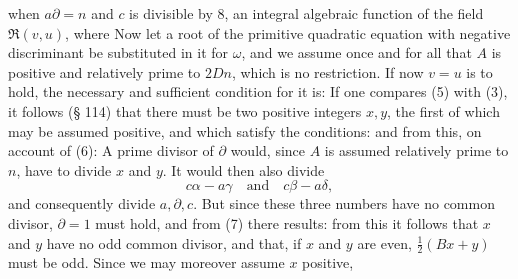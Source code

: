 when $a\partial = n$ and $c$ is divisible by 8, an integral algebraic
function of the field $\mathfrak{R}(v,u)$, where
Now let a root of the primitive quadratic equation
with negative discriminant
be substituted in it for $\omega$, and we assume once and for all that $A$ is
positive and relatively prime to $2Dn$, which is no restriction. If now
$v = u$ is to hold, the necessary and sufficient condition for it
is:
If one compares (5) with (3), it follows (§ 114) that there must be two
positive integers $x, y$, the first of which may be assumed positive, and which satisfy the conditions:
and from this, on account of (6):
A prime divisor of $\partial$ would, since $A$ is assumed relatively prime to $n$, have to divide $x$ and $y$. It would then also divide
\[
c\alpha - a\gamma \quad\text{and}\quad c\beta - a\delta,
\]
and consequently divide $a, \partial, c$. But since these three numbers have no common divisor, $\partial = 1$ must hold, and from (7) there results:
from this it follows that $x$ and $y$ have no odd common divisor, and that, if $x$ and $y$ are even, $\frac{1}{2}(Bx+y)$ must be odd. Since we may moreover assume $x$ positive,
